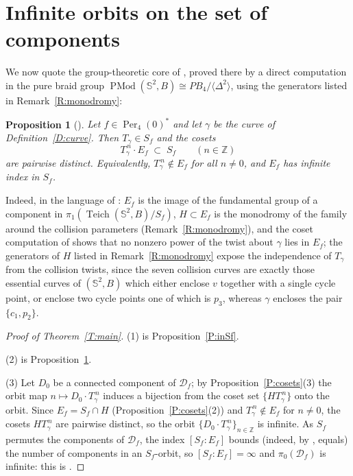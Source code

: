 \documentclass[11pt]{amsart}
\newtheorem{proposition}[theorem]{Proposition}
\newcommand{\Sph}{\mathbb{S}^{2}}
\newcommand{\Teich}{\operatorname{Teich}}
\newcommand{\PMod}{\operatorname{PMod}}
\newcommand{\Def}{\mathcal{D}}
\begin{document}
\section{Infinite orbits on the set of components}\label{S:infinite}

We now quote the group-theoretic core of \cite{Luo}, proved there by a
direct computation in the pure braid group $\PMod(\Sph,B)\cong
PB_4/\langle\Delta^2\rangle$, using the generators listed in
Remark~\ref{R:monodromy}:

\begin{proposition}[{\cite[\S4--6]{Luo}}]\label{P:index}
Let $f\in\operatorname{Per}_4(0)^*$ and let $\gamma$ be the curve of
Definition~\emph{\ref{D:curve}}. Then $T_\gamma\in S_f$ and the cosets
\[
T_\gamma^{\,n}\cdot E_f\;\subset\; S_f\qquad (n\in\mathbb{Z})
\]
are pairwise distinct. Equivalently, $T_\gamma^{\,n}\notin E_f$ for all
$n\ne 0$, and $E_f$ has infinite index in $S_f$.
\end{proposition}

Indeed, in the language of \cite{Luo}: $E_f$ is the image of the
fundamental group of a component in $\pi_1(\Teich(\Sph,B)/S_f)$, $H\subset
E_f$ is the monodromy of the family around the collision parameters
(Remark~\ref{R:monodromy}), and the coset computation of
\cite[Prop.~5.6, \S6]{Luo} shows that no nonzero power of the twist about
$\gamma$ lies in $E_f$; the generators of $H$ listed in
Remark~\ref{R:monodromy} expose the independence of $T_\gamma$ from the
collision twists, since the seven collision curves are exactly those
essential curves of $(\Sph,B)$ which either enclose $v$ together with a
single cycle point, or enclose two cycle points one of which is $p_3$,
whereas $\gamma$ encloses the pair $\{c_1,p_2\}$.

\begin{proof}[Proof of Theorem~\emph{\ref{T:main}}]
(1) is Proposition~\ref{P:inSf}.

(2) is Proposition~\ref{P:index}.

(3) Let $D_0$ be a connected component of $\Def_f$; by
Proposition~\ref{P:cosets}(3) the orbit map
$n\mapsto D_0\cdot T_\gamma^{\,n}$ induces a bijection from the coset set
$\{HT_\gamma^{\,n}\}$ onto the orbit. Since $E_f=S_f\cap H$
(Proposition~\ref{P:cosets}(2)) and $T_\gamma^{\,n}\notin E_f$ for
$n\ne0$, the cosets $HT_\gamma^{\,n}$ are pairwise distinct, so the orbit
$\{D_0\cdot T_\gamma^{\,n}\}_{n\in\mathbb{Z}}$ is infinite. As $S_f$
permutes the components of $\Def_f$, the index $[S_f:E_f]$ bounds (indeed,
by \cite{Luo}, equals) the number of components in an $S_f$-orbit, so
$[S_f:E_f]=\infty$ and $\pi_0(\Def_f)$ is infinite: this is
\cite[Thm.~1.3]{Luo}.
\end{proof}
\end{document}

